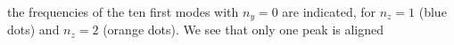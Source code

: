 
the frequencies of the ten first modes with $n_y=0$ are indicated, for $n_z=1$
(blue dots) and $n_z=2$ (orange dots). We see that only one peak is aligned
